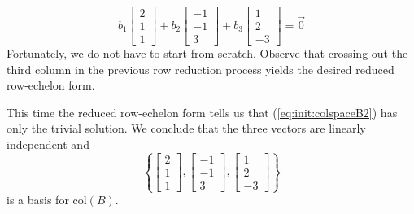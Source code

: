 \documentclass{ximera}
\begin{document}
\begin{exploration}
\begin{equation}\label{eq:init:colspaceB2} b_1\begin{bmatrix}2\\1\\1\end{bmatrix}+b_2\begin{bmatrix}-1\\-1\\3\end{bmatrix}+b_3\begin{bmatrix}1\\2\\-3\end{bmatrix}=\vec{0}\end{equation}
Fortunately, we do not have to start from scratch.  Observe that crossing out the third column in the previous row reduction process yields the desired reduced row-echelon form.
\begin{center}
 \end{center} 
 This time the reduced row-echelon form tells us that (\ref{eq:init:colspaceB2}) has only the trivial solution.  We conclude that the three vectors are linearly independent and 
 $$\left\{\begin{bmatrix}2\\1\\1\end{bmatrix},\begin{bmatrix}-1\\-1\\3\end{bmatrix}, \begin{bmatrix}1\\2\\-3\end{bmatrix}\right\}$$
 is a basis for $\mbox{col}(B)$.
\end{exploration}
\end{document}
